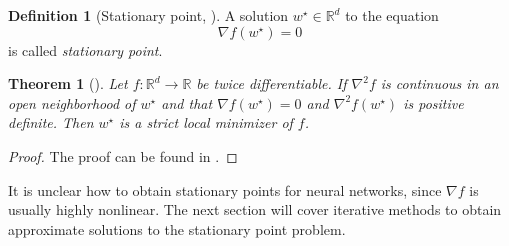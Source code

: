 \documentclass[12pt]{article}
\newtheorem{theorem}{Theorem}[section]
\theoremstyle{definition}
\newtheorem{definition}[definition]{Definition}
\numberwithin{equation}{section}
\newcommand{\R}{\mathbb{R}}
\begin{document}
\begin{definition}[Stationary point, ]
  A solution $w^\star \in \mathbb{R}^d$ to the equation
  \begin{equation}
  \label{eq:StationaryPoint}
    \nabla f(w^\star) = 0
  \end{equation}
  is called \emph{stationary point}.
\end{definition}
\begin{theorem}[]
  Let $f:\R^d \rightarrow \R$ be twice differentiable. If $\nabla^2 f$ is continuous in an open neighborhood of $w^\star$ and that $\nabla f(w^\star) = 0$ and $\nabla^2f(w^\star)$ is positive definite. Then $w^\star$ is a strict local minimizer of $f$.
\end{theorem}
\begin{proof}
  The proof can be found in \cite[pp.~16]{nocedalNumericalOptimization2006}.
\end{proof}

It is unclear how to obtain stationary points for neural networks, since $\nabla f$ is usually highly nonlinear. The next section will cover iterative methods to obtain approximate solutions to the stationary point problem.
\end{document}
